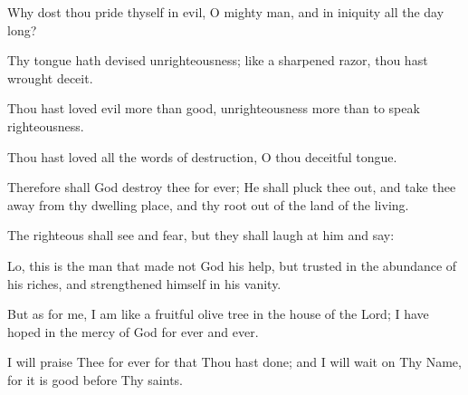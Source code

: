 Why dost thou pride thyself in evil, O mighty man, and in iniquity all the day long? 

Thy tongue hath devised unrighteousness; like a sharpened razor, thou hast wrought deceit.

Thou hast loved evil more than good, unrighteousness more than to speak righteousness.

Thou hast loved all the words of destruction, O thou deceitful tongue.

Therefore shall God destroy thee for ever; He shall pluck thee out, and take thee away from thy dwelling place, and thy root out of the land of the living.

The righteous shall see and fear, but they shall laugh at him and say:

Lo, this is the man that made not God his help, but trusted in the abundance of his riches, and strengthened himself in his vanity.

But as for me, I am like a fruitful olive tree in the house of the Lord; I have hoped in the mercy of God for ever and ever.

I will praise Thee for ever for that Thou hast done; and I will wait on Thy Name, for it is good before Thy saints.
